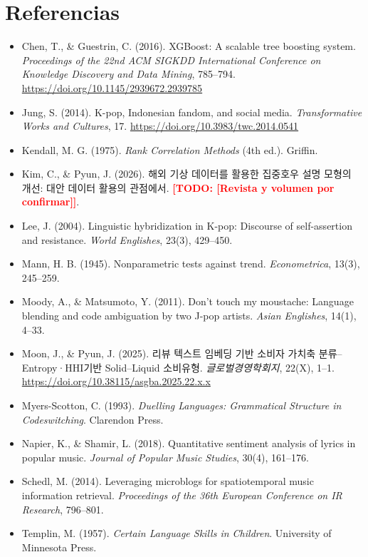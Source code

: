 \documentclass[11pt,a4paper]{article}
\newcommand{\todo}[1]{\textcolor{red}{\textbf{[TODO: #1]}}}
\begin{document}
\section*{Referencias}

\begin{itemize}[leftmargin=1.2em, label={}, itemsep=0.3em]

\item Chen, T., \& Guestrin, C. (2016). XGBoost: A scalable tree boosting system.
\textit{Proceedings of the 22nd ACM SIGKDD International Conference on Knowledge
Discovery and Data Mining}, 785--794.
\url{https://doi.org/10.1145/2939672.2939785}

\item Jung, S. (2014). K-pop, Indonesian fandom, and social media.
\textit{Transformative Works and Cultures}, 17.
\url{https://doi.org/10.3983/twc.2014.0541}

\item Kendall, M. G. (1975). \textit{Rank Correlation Methods} (4th ed.).
Griffin.

\item Kim, C., \& Pyun, J. (2026).
해외 기상 데이터를 활용한 집중호우 설명 모형의 개선: 대안 데이터 활용의 관점에서.
\todo{[Revista y volumen por confirmar]}.

\item Lee, J. (2004). Linguistic hybridization in K-pop: Discourse of
self-assertion and resistance.
\textit{World Englishes}, 23(3), 429--450.

\item Mann, H. B. (1945). Nonparametric tests against trend.
\textit{Econometrica}, 13(3), 245--259.

\item Moody, A., \& Matsumoto, Y. (2011). Don't touch my moustache: Language
blending and code ambiguation by two J-pop artists.
\textit{Asian Englishes}, 14(1), 4--33.

\item Moon, J., \& Pyun, J. (2025).
리뷰 텍스트 임베딩 기반 소비자 가치축 분류--Entropy·HHI기반 Solid--Liquid 소비유형.
\textit{글로벌경영학회지}, 22(X), 1--1.
\url{https://doi.org/10.38115/asgba.2025.22.x.x}

\item Myers-Scotton, C. (1993). \textit{Duelling Languages: Grammatical Structure
in Codeswitching}. Clarendon Press.

\item Napier, K., \& Shamir, L. (2018). Quantitative sentiment analysis of
lyrics in popular music.
\textit{Journal of Popular Music Studies}, 30(4), 161--176.

\item Schedl, M. (2014). Leveraging microblogs for spatiotemporal music
information retrieval.
\textit{Proceedings of the 36th European Conference on IR Research}, 796--801.

\item Templin, M. (1957). \textit{Certain Language Skills in Children}.
University of Minnesota Press.

\end{itemize}
\end{document}
